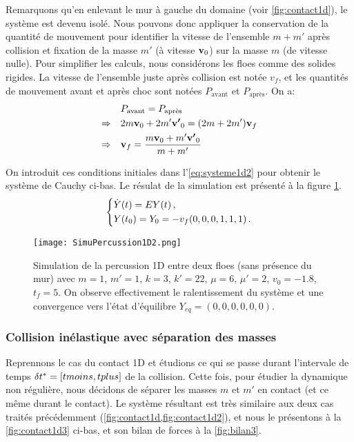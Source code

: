 Remarquons qu'en enlevant le mur à gauche du domaine (voir \cref{fig:contact1d}), le système est devenu isolé. Nous pouvons donc appliquer la conservation de la quantité de mouvement pour identifier la vitesse de l'ensemble $m+m'$ après collision et fixation de la masse $m'$ (à vitesse $\bm{\mathrm{v}}_0$) sur la masse $m$ (de vitesse nulle). Pour simplifier les calculs, nous considérons les floes comme des solides rigides. La vitesse de l'ensemble juste après collision est notée $v_f$, et les quantités de mouvement avant et après choc sont notées $P_{\text{avant}}$ et $P_{\text{après}}$. On a:
\begin{align*}
    & \quad P_{\text{avant}} = P_{\text{après}} \\
    \Rightarrow & \quad 2m \bm{\mathrm{v}}_0 + 2m'\bm{\mathrm{v'}}_0 = (2m + 2m') \bm{\mathrm{v}}_f \\
    \Rightarrow & \quad \bm{\mathrm{v}}_f = \frac{m \bm{\mathrm{v}}_0 + m'\bm{\mathrm{v'}}_0}{m+m'}
\end{align*} 

\noindent On introduit ces conditions initiales dans l'\cref{eq:systeme1d2} pour obtenir le système de Cauchy ci-bas. Le résulat de la simulation est présenté à la figure \cref{fig:simucontact1d2}. 
\begin{align} \label{eq:systeme1d3}
    \begin{dcases}
        \dot{Y}(t)= E Y(t) \,, \\
        Y(t_0) = Y_0 = -v_f(0,0,0,1,1,1) \,.        
    \end{dcases}
\end{align}

\begin{figure}[!h]
    \centering
    \texttt{[image: SimuPercussion1D2.png]}
    \caption{Simulation de la percussion 1D entre deux floes (sans présence du mur) avec $m=1$, $m'=1$, $k=3$, $k'=22$, $\mu=6$, $\mu'=2$, $v_0=-1.8$, $t_{f}=5$. On observe effectivement le ralentissement du système et une convergence vers l'état d'équilibre $Y_{eq}= (0,0,0,0,0,0)$.} 
    \label{fig:simucontact1d2}
\end{figure}






\subsubsection{Collision inélastique avec séparation des masses}

Reprennons le cas du contact 1D et étudions ce qui se passe durant l'intervale de temps $\delta t^{*} = [tmoins, tplus]$ de la collision. Cette fois, pour étudier la dynamique non régulière, nous décidons de séparer les masses $m$ et $m'$ en contact (et ce même durant le contact). Le système résultant est très similaire aux deux cas traités précédemment (\cref{fig:contact1d,fig:contact1d2}), et nous le présentons à la \cref{fig:contact1d3} ci-bas, et son bilan de forces à la \cref{fig:bilan3}.

